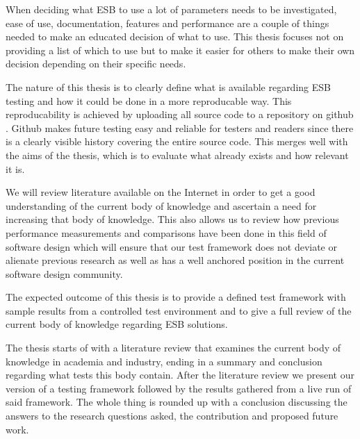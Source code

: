 When deciding what ESB to use a lot of parameters needs to be investigated, ease of use, documentation, features and performance are a couple of things needed to make an educated decision of what to use. 
This thesis focuses not on providing a list of which to use but to make it easier for others to make their own decision depending on their specific needs.

The nature of this thesis is to clearly define what is available regarding ESB testing and how it could be done in a more reproducable way. 
This reproducability is achieved by uploading all source code to a repository on github \cite{github}.
Github makes future testing easy and reliable for testers and readers since there is a clearly visible history covering the entire source code.
This merges well with the aims of the thesis, which is to evaluate what already exists and how relevant it is.

We will review literature available on the Internet in order to get a good understanding of the current body of knowledge and ascertain a need for increasing that body of knowledge. 
This also allows us to review how previous performance measurements and comparisons have been done in this field of software design which will ensure that our test framework does not deviate or alienate previous research as well as has a well anchored position in the current software design community.

The expected outcome of this thesis is to provide a defined test framework with sample results from a controlled test environment and to give a full review of the current body of knowledge regarding ESB solutions.

The thesis starts of with a literature review that examines the current body of knowledge in academia and industry, ending in a summary and conclusion regarding what tests this body contain.
After the literature review we present our version of a testing framework followed by the results gathered from a live run of said framework.
The whole thing is rounded up with a conclusion discussing the answers to the research questions asked, the contribution and proposed future work.

